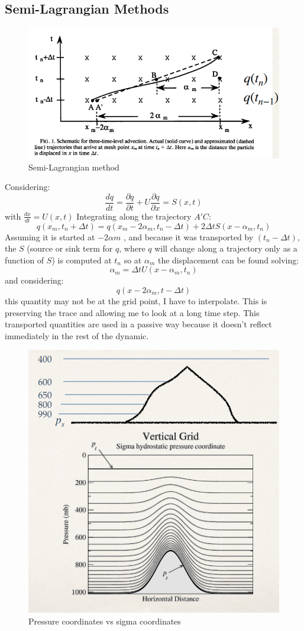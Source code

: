 \subsection{Semi-Lagrangian Methods}
\begin{figure}[h!]
    \centering
    \includegraphics[width=0.5\linewidth]{uploads/Screenshot 2024-11-19 142400.png}
    \caption{Semi-Lagrangian method}
    \label{fig:enter-label}
\end{figure}
Considering:
$$\frac{dq}{dt}=\frac{\partial q}{\partial t}+U\frac{\partial q}{\partial x}=S(x,t)$$
with $\frac{dx}{dt}=U(x,t)$
Integrating along the trajectory $A'C$:
$$q(x_m,t_n+\Delta t)=q(x_m-2\alpha_m,t_n-\Delta t)+2\Delta tS(x-\alpha_m,t_n)$$
Assuming it is started at $-2\alpha m$ , and because it was transported by $(t_n - \Delta t)$, the $S$ (source or sink term for $q$, where $q$ will change along a trajectory only as a function of $S$) is computed at $t_n$ so at $\alpha_m$ the displacement can be found solving:
$$\alpha_m=\Delta tU(x-\alpha_m,t_n)$$
and considering:
$$q(x-2\alpha_m,t-\Delta t)$$ this quantity may not be at the grid point, I have to interpolate. This is preserving the trace and allowing me to look at a long time step. This transported quantities are used in a passive way because it doesn't reflect immediately in the rest of the dynamic.
\begin{figure}
  \begin{center}
    \includegraphics[width=0.45\linewidth]{uploads/Screenshot 2024-11-19 143432.png}
  \end{center}
 \caption{Pressure coordinates vs sigma coordinates}
    \label{fig:sigmababy}
\end{figure}

